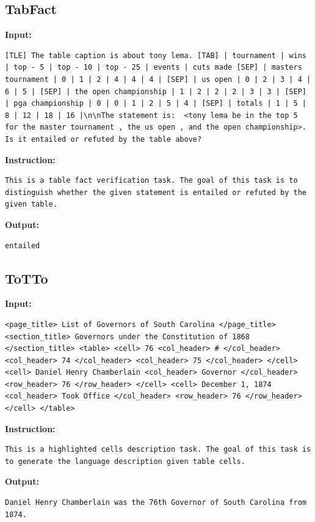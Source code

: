 \documentclass[11pt]{article}
\begin{document}
\subsection{TabFact}
\textbf{Input:}
\begin{lstlisting}
[TLE] The table caption is about tony lema. [TAB] | tournament | wins | top - 5 | top - 10 | top - 25 | events | cuts made [SEP] | masters tournament | 0 | 1 | 2 | 4 | 4 | 4 | [SEP] | us open | 0 | 2 | 3 | 4 | 6 | 5 | [SEP] | the open championship | 1 | 2 | 2 | 2 | 3 | 3 | [SEP] | pga championship | 0 | 0 | 1 | 2 | 5 | 4 | [SEP] | totals | 1 | 5 | 8 | 12 | 18 | 16 |\n\nThe statement is:  <tony lema be in the top 5 for the master tournament , the us open , and the open championship>. Is it entailed or refuted by the table above?
\end{lstlisting}
\textbf{Instruction:}
\begin{lstlisting}
This is a table fact verification task. The goal of this task is to distinguish whether the given statement is entailed or refuted by the given table.
\end{lstlisting}
\textbf{Output:}
\begin{lstlisting}
entailed
\end{lstlisting}


\subsection{ToTTo}
\textbf{Input:}
\begin{lstlisting}
<page_title> List of Governors of South Carolina </page_title> <section_title> Governors under the Constitution of 1868 </section_title> <table> <cell> 76 <col_header> # </col_header> <col_header> 74 </col_header> <col_header> 75 </col_header> </cell> <cell> Daniel Henry Chamberlain <col_header> Governor </col_header> <row_header> 76 </row_header> </cell> <cell> December 1, 1874 <col_header> Took Office </col_header> <row_header> 76 </row_header> </cell> </table>
\end{lstlisting}
\textbf{Instruction:}
\begin{lstlisting}
This is a highlighted cells description task. The goal of this task is to generate the language description given table cells.
\end{lstlisting}
\textbf{Output:}
\begin{lstlisting}
Daniel Henry Chamberlain was the 76th Governor of South Carolina from 1874.
\end{lstlisting}
\end{document}

